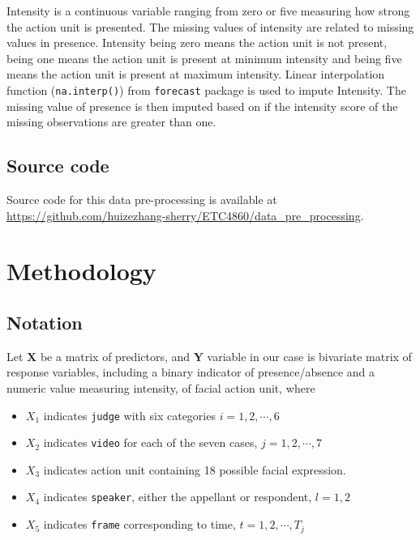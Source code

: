 \documentclass{monashthesis}
\begin{document}
Intensity is a continuous variable ranging from zero or five measuring how strong the action unit is presented. The missing values of intensity are related to missing values in presence. Intensity being zero means the action unit is not present, being one means the action unit is present at minimum intensity and being five means the action unit is present at maximum intensity. Linear interpolation function (\texttt{na.interp()}) from \texttt{forecast} package is used to impute Intensity. The missing value of presence is then imputed based on if the intensity score of the missing observations are greater than one.

\hypertarget{source-code}{%
\section{Source code}\label{source-code}}

Source code for this data pre-processing is available at \url{https://github.com/huizezhang-sherry/ETC4860/data_pre_processing}.

\let\cleardoublepage\clearpage

\hypertarget{Ch:method}{%
\chapter{Methodology}\label{Ch:method}}

\hypertarget{notation}{%
\section{Notation}\label{notation}}

Let \(\mathbf{X}\) be a matrix of predictors, and \(\mathbf{Y}\) variable in our case is bivariate matrix of response variables, including a binary indicator of presence/absence and a numeric value measuring intensity, of facial action unit, where

\begin{itemize}
\tightlist
\item
  \(X_1\) indicates \texttt{judge} with six categories \(i = 1,2, \cdots, 6\)
\item
  \(X_2\) indicates \texttt{video} for each of the seven cases, \(j = 1,2, \cdots, 7\)
\item
  \(X_3\) indicates action unit containing 18 possible facial expression.
\item
  \(X_4\) indicates \texttt{speaker}, either the appellant or respondent, \(l=1,2\)
\item
  \(X_5\) indicates \texttt{frame} corresponding to time, \(t = 1,2, \cdots, T_j\)
\end{itemize}
\end{document}
